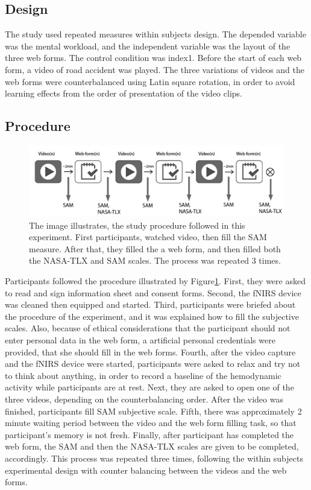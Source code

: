 \documentclass[../main/Feedback.tex]{subfiles}
\begin{document}
\subsection{Design}
The study used repeated measures within subjects design. The depended variable was the mental workload, and the independent variable was the layout of the three web forms. The control condition was index1. Before the start of each web form, a video of road accident was played. The three variations of videos and the web forms were counterbalanced using Latin square rotation, in order to avoid learning effects from the order of presentation of the video clips.
\subsection{Procedure}
\begin{figure}[h]
	\centering
	\includegraphics[width=0.8\linewidth]{../figures/study-procedure}
	\caption[study procedure]{The image illustrates, the study procedure followed in this experiment. First participants, watched video, then fill the SAM measure. After that, they filled the a web form, and then filled both the NASA-TLX and SAM scales. The process was repeated 3 times.}
	\label{fig:study-procedure}
\end{figure}		
Participants followed the procedure illustrated by Figure\ref{fig:study-procedure}. First, they were asked to read and sign information sheet and consent forms. Second, the fNIRS device was cleaned then equipped and started. Third, participants were briefed about the procedure of the experiment, and it was explained how to fill the subjective scales. Also, because of ethical considerations that the participant should not enter personal data in the web form, a artificial personal credentials were provided, that she should fill in the web forms. Fourth, after the video capture and the fNIRS device were started, participants were asked to relax and try not to think about anything, in order to record a baseline of the hemodynamic activity while participants are at rest. Next, they are asked to open one of the three videos, depending on the counterbalancing order. After the video was finished, participants fill SAM subjective scale. Fifth, there was approximately 2 minute waiting period between the video and the web form filling task, so that participant's memory is not fresh. Finally, after participant has completed the web form, the SAM and then the NASA-TLX scales are given to be completed, accordingly. This process was repeated three times, following the within subjects experimental design with counter balancing between the videos and the web forms. 
\end{document}
